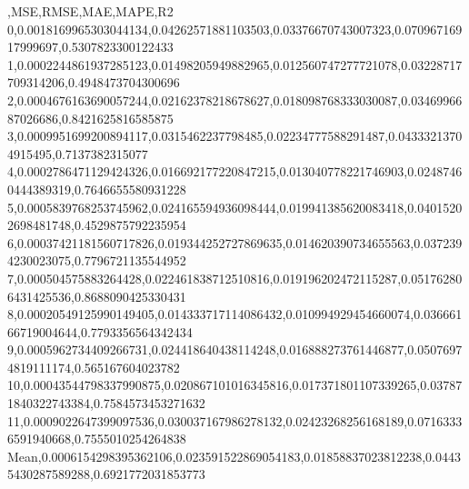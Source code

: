 ,MSE,RMSE,MAE,MAPE,R2
0,0.0018169965303044134,0.04262571881103503,0.03376670743007323,0.07096716917999697,0.5307823300122433
1,0.0002244861937285123,0.01498205949882965,0.012560747277721078,0.03228717709314206,0.4948473704300696
2,0.0004676163690057244,0.02162378218678627,0.018098768333030087,0.0346996687026686,0.8421625816585875
3,0.0009951699200894117,0.0315462237798485,0.02234777588291487,0.04333213704915495,0.7137382315077
4,0.0002786471129424326,0.016692177220847215,0.013040778221746903,0.02487460444389319,0.7646655580931228
5,0.0005839768253745962,0.024165594936098444,0.019941385620083418,0.04015202698481748,0.4529875792235954
6,0.00037421181560717826,0.019344252727869635,0.014620390734655563,0.0372394230023075,0.7796721135544952
7,0.000504575883264428,0.022461838712510816,0.019196202472115287,0.051762806431425536,0.8688090425330431
8,0.00020549125990149405,0.014333717114086432,0.010994929454660074,0.03666166719004644,0.7793356564342434
9,0.0005962734409266731,0.024418640438114248,0.016888273761446877,0.05076974819111174,0.565167604023782
10,0.00043544798337990875,0.020867101016345816,0.017371801107339265,0.037871840322743384,0.7584573453271632
11,0.0009022647399097536,0.030037167986278132,0.02423268256168189,0.07163336591940668,0.7555010254264838
Mean,0.0006154298395362106,0.023591522869054183,0.01858837023812238,0.04435430287589288,0.6921772031853773
